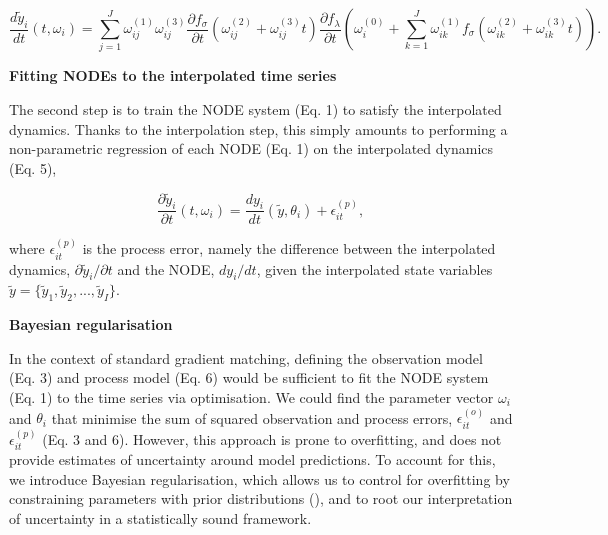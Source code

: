 \documentclass[11pt, oneside]{article}
\begin{document}
\vspace{-0.5cm}
\begin{equation}
    \frac{d\tilde{y}_i}{dt} (t, \omega_i) = \sum_{j=1}^{J} \omega^{(1)}_{ij} \omega^{(3)}_{ij} \frac{\partial f_\sigma}{\partial t} \left(\omega^{(2)}_{ij} + \omega^{(3)}_{ij} t \right) \frac{\partial f_\lambda}{\partial t} \left ( \omega^{(0)}_{i} + \sum_{k=1}^{J} \omega^{(1)}_{ik} f_\sigma \left( \omega^{(2)}_{ik} + \omega^{(3)}_{ik} t \right) \right ). 
\end{equation}

\textbf{Fitting NODEs to the interpolated time series}

The second step is to train the NODE system (Eq. 1) to satisfy the interpolated dynamics.
Thanks to the interpolation step, this simply amounts to performing a non-parametric regression of each NODE (Eq. 1) on the interpolated dynamics (Eq. 5),

\vspace{-0.5cm}
\begin{equation}
    \frac{\partial \tilde{y}_i}{\partial t} (t, \omega_i) = \frac{dy_i}{dt} \left( \tilde{y},\theta_i \right) + \epsilon^{(p)}_{it},
\end{equation}

where $\epsilon^{(p)}_{it}$ is the process error, namely the difference between the interpolated dynamics, $\partial \tilde{y}_i/\partial t$ and the NODE, $dy_i/dt$, given the interpolated state variables $\tilde{y} = \{\tilde{y}_1,\tilde{y}_2, ...,\tilde{y}_I\}$. 

\textbf{Bayesian regularisation}

In the context of standard gradient matching, defining the observation model (Eq. 3) and process model (Eq. 6) would be sufficient to fit the NODE system (Eq. 1) to the time series via optimisation.
We could find the parameter vector $\omega_i$ and $\theta_i$ that minimise the sum of squared observation and process errors, $\epsilon_{it}^{(o)}$ and $\epsilon_{it}^{(p)}$ (Eq. 3 and 6).
However, this approach is prone to overfitting, and does not provide estimates of uncertainty around model predictions. 
To account for this, we introduce Bayesian regularisation, which allows us to control for overfitting by constraining parameters with prior distributions (\cite{Cawley2007}), and to root our interpretation of uncertainty in a statistically sound framework.
\end{document}
